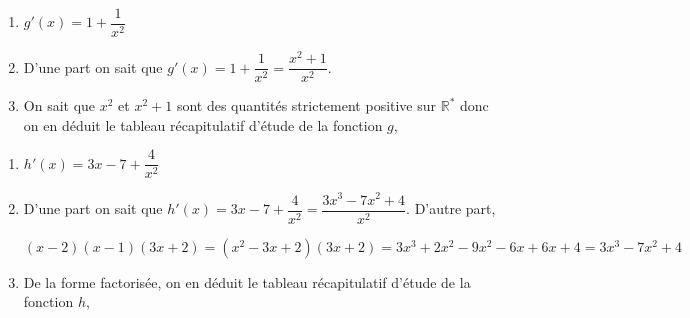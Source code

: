 \documentclass[french]{book}
\begin{document}
\begin{corrige}
\begin{enumerate}

\item $g'(x)=1+\dfrac{1}{x^2}$
\item D'une part on sait que $g'(x)=1+\dfrac{1}{x^2}=\dfrac{x^2+1}{x^2}$.
\item On sait que $x^2$ et $x^2+1$ sont des quantités strictement positive sur $\mathbb{R}^*$ donc on en déduit le tableau récapitulatif d'étude de la fonction $g$,
\begin{center}
\end{center}
\end{enumerate}
\end{corrige}

\begin{corrige}
\begin{enumerate}

\item $h'(x)=3x-7+\dfrac{4}{x^2}$
\item D'une part on sait que $h'(x)=3x-7+\dfrac{4}{x^2}=\dfrac{3x^3 -7x^2 +4}{x^2}$. D'autre part, 

$$(x-2)(x-1)(3x+2)=(x^2-3x+2)(3x+2)=3x^3+2x^2-9x^2-6x+6x+4=3x^3 -7x^2 +4$$
 
\item De la forme factorisée, on en déduit le tableau récapitulatif d'étude de la fonction $h$,
\begin{center}
\end{center}
\end{enumerate}
\end{corrige}

\newpage
\end{document}
